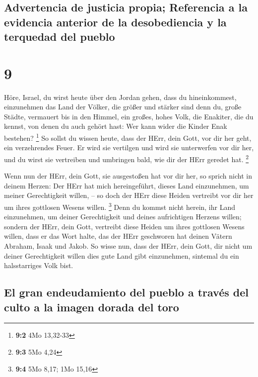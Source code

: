 \hypertarget{advertencia-de-justicia-propia-referencia-a-la-evidencia-anterior-de-la-desobediencia-y-la-terquedad-del-pueblo}{%
\subsection{Advertencia de justicia propia; Referencia a la evidencia
anterior de la desobediencia y la terquedad del
pueblo}\label{advertencia-de-justicia-propia-referencia-a-la-evidencia-anterior-de-la-desobediencia-y-la-terquedad-del-pueblo}}

\hypertarget{section-8}{%
\section{9}\label{section-8}}

 Höre, Israel, du wirst heute über den Jordan gehen, dass
du hineinkommest, einzunehmen das Land der Völker, die größer und
stärker sind denn du, große Städte, vermauert bis in den Himmel,
 ein großes, hohes Volk, die Enakiter, die du kennst, von
denen du auch gehört hast: Wer kann wider die Kinder Enak bestehen?
\footnote{\textbf{9:2} 4Mo 13,32-33}  So sollst du wissen
heute, dass der HErr, dein Gott, vor dir her geht, ein verzehrendes
Feuer. Er wird sie vertilgen und wird sie unterwerfen vor dir her, und
du wirst sie vertreiben und umbringen bald, wie dir der HErr geredet
hat. \footnote{\textbf{9:3} 5Mo 4,24}

 Wenn nun der HErr, dein Gott, sie ausgestoßen hat vor dir
her, so sprich nicht in deinem Herzen: Der HErr hat mich hereingeführt,
dieses Land einzunehmen, um meiner Gerechtigkeit willen, -- so doch der
HErr diese Heiden vertreibt vor dir her um ihres gottlosen Wesens
willen. \footnote{\textbf{9:4} 5Mo 8,17; 1Mo 15,16}  Denn
du kommst nicht herein, ihr Land einzunehmen, um deiner Gerechtigkeit
und deines aufrichtigen Herzens willen; sondern der HErr, dein Gott,
vertreibt diese Heiden um ihres gottlosen Wesens willen, dass er das
Wort halte, das der HErr geschworen hat deinen Vätern Abraham, Isaak und
Jakob.  So wisse nun, dass der HErr, dein Gott, dir nicht
um deiner Gerechtigkeit willen dies gute Land gibt einzunehmen, sintemal
du ein halsstarriges Volk bist.

\hypertarget{el-gran-endeudamiento-del-pueblo-a-travuxe9s-del-culto-a-la-imagen-dorada-del-toro}{%
\subsection{El gran endeudamiento del pueblo a través del culto a la
imagen dorada del
toro}\label{el-gran-endeudamiento-del-pueblo-a-travuxe9s-del-culto-a-la-imagen-dorada-del-toro}}

